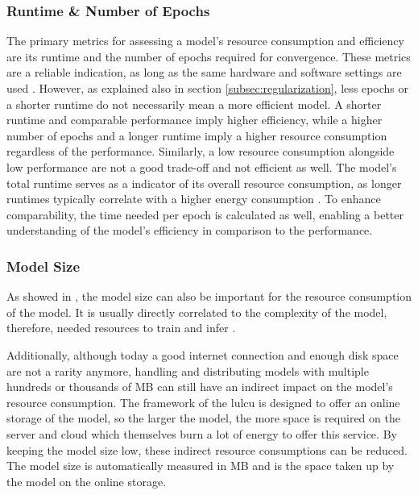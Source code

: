 \subsubsection*{Runtime \& Number of Epochs}

The primary metrics for assessing a model's resource consumption and efficiency are its runtime and the number of epochs required for convergence. These metrics are a reliable indication, as long as the same hardware and software settings are used \autocite{Mehlin.Schacht.ea2023}. However, as explained also in section \ref{subsec:regularization}, less epochs or a shorter runtime do not necessarily mean a more efficient model. A shorter runtime and comparable performance imply higher efficiency, while a higher number of epochs and a longer runtime imply a higher resource consumption regardless of the performance. Similarly, a low resource consumption alongside low performance are not a good trade-off and not efficient as well. The model's total runtime serves as a indicator of its overall resource consumption, as longer runtimes typically correlate with a higher energy consumption \autocite{Li.Jiang.ea2021,Xu.Zhou.ea2021}. To enhance comparability, the time needed per epoch is calculated as well, enabling a better understanding of the model's efficiency in comparison to the performance.

\subsubsection*{Model Size}

As showed in \textcite{Mehlin.Schacht.ea2023,Tao.Meng.ea2022}, the model size can also be important for the resource consumption of the model. It is usually directly correlated to the complexity of the model, therefore, needed resources to train and infer \autocite{Xu.Zhou.ea2021}.

Additionally, although today a good internet connection and enough disk space are not a rarity anymore, handling and distributing models with multiple hundreds or thousands of MB can still have an indirect impact on the model's resource consumption. The framework of the \gls{lulcu} is designed to offer an online storage of the model, so the larger the model, the more space is required on the server and cloud which themselves burn a lot of energy to offer this service. By keeping the model size low, these indirect resource consumptions can be reduced. The model size is automatically measured in MB and is the space taken up by the model on the online storage.

